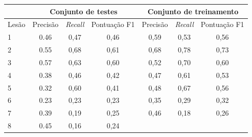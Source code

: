 \begin{table}[ht]
    \centering
    \begin{tabular}{l|c|c|c|c|c|c}
        \hline
              & \multicolumn{3}{c|}{Conjunto de testes} & \multicolumn{3}{c}{Conjunto de treinamento}
        \\ \hline
        Lesão & Precisão                                & \textit{Recall}                             & Pontuação
        F1    & Precisão                                & \textit{Recall}                             & Pontuação
        F1
        \\
        \hline
        1     & 0.46                                    & 0,47                                        & 0,46      &
        0,59  & 0,53                                    & 0,56                                                      \\
        2     & 0.55                                    & 0,68                                        & 0,61      &
        0,68  & 0,78                                    & 0,73                                                      \\
        3     & 0.57                                    & 0,63                                        & 0,60      &
        0,52  & 0,70                                    & 0,60                                                      \\
        4     & 0.38                                    & 0,46                                        & 0,42      &
        0,47  & 0,61                                    & 0,53                                                      \\
        5     & 0.32                                    & 0,60                                        & 0,41      &
        0,48  & 0,67                                    & 0,56                                                      \\
        6     & 0.23                                    & 0,23                                        & 0,23      &
        0,35  & 0,29                                    & 0,32                                                      \\
        7     & 0.39                                    & 0,19                                        & 0,25      &
        0,46  & 0,18                                    & 0,26                                                      \\
        8     & 0.45                                    & 0,16                                        & 0,24      &

\end{tabular}
\end{table}
